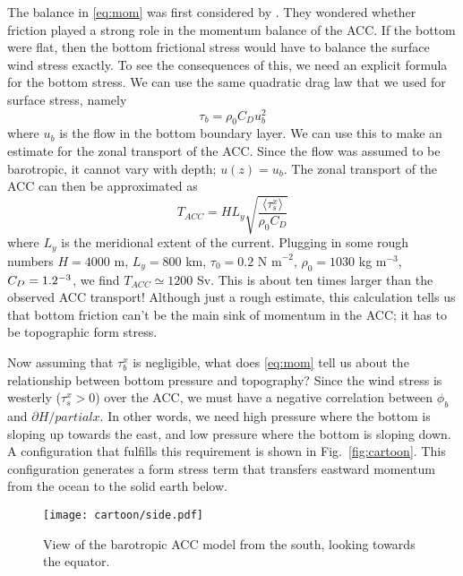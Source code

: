 \documentclass[12pt]{article}
\newcommand{\ab}[1]{\ensuremath{\langle #1 \rangle}}
\newcommand{\nms}{\ensuremath{\mbox{ N m}^{-2}}}
\begin{document}
The balance in \eqref{eq:mom} was first considered by \citet{MunkPalmen1951}. They wondered whether friction played a strong role in the momentum balance of the ACC. If the bottom were flat, then the bottom frictional stress would have to balance the surface wind stress exactly. To see the consequences of this, we need an explicit formula for the bottom stress. We can use the same quadratic drag law that we used for surface stress, namely
\begin{equation}
\tau_b = \rho_0 C_D u_b^2
\end{equation}
where $u_b$ is the flow in the bottom boundary layer. We can use this to make an estimate for the zonal transport of the ACC. Since the flow was assumed to be barotropic, it cannot vary with depth; $u(z) = u_b$. The zonal transport of the ACC can then be approximated as
\begin{equation}
T_{ACC} = H L_y \sqrt{ \frac{ \ab{\tau^x_s} }{ \rho_0 C_D } }
\end{equation}
where $L_y$ is the meridional extent of the current. Plugging in some rough numbers $H = 4000$ m, $L_y = 800$ km, $\tau_0 = 0.2 \nms$, $\rho_0 = 1030$ kg m$^{-3}$, $C_D = 1.2 \time 10^{-3}$, we find $T_{ACC} \simeq 1200 $ Sv. This is about ten times larger than the observed ACC transport! Although just a rough estimate, this calculation tells us that bottom friction can't be the main sink of momentum in the ACC; it has to be topographic form stress. 

Now assuming that $\tau^x_b$ is negligible, what does \eqref{eq:mom} tell us about the relationship between bottom pressure and topography? Since the wind stress is westerly ($\tau^x_s > 0$) over the ACC, we must have a negative correlation between $\phi_b$ and $\partial H / partial x$. In other words, we need high pressure where the bottom is sloping up towards the east, and low pressure where the bottom is sloping down. A configuration that fulfills this requirement is shown in Fig.~\ref{fig:cartoon}. This configuration generates a form stress term that transfers eastward momentum from the ocean to the solid earth below.

\begin{figure}[htbp]
\begin{center}
\texttt{[image: cartoon/side.pdf]}
\caption{View of the barotropic ACC model from the south, looking towards the equator.}
\label{fig:cartoon_side}
\end{center}
\end{figure}
\end{document}
